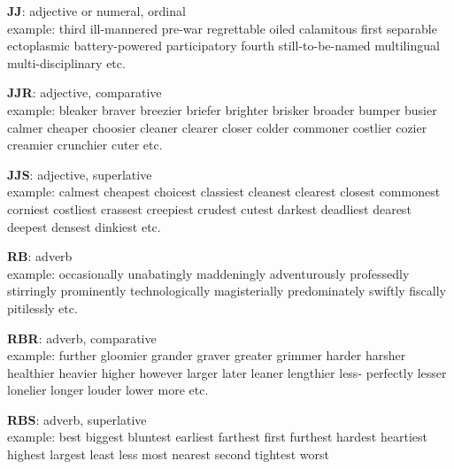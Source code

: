 {\bf JJ}: adjective or numeral, ordinal\\
example: third ill-mannered pre-war regrettable oiled calamitous first separable
ectoplasmic battery-powered participatory fourth still-to-be-named
multilingual multi-disciplinary etc.


{\bf JJR}: adjective, comparative\\
example: bleaker braver breezier briefer brighter brisker broader bumper busier
calmer cheaper choosier cleaner clearer closer colder commoner costlier
cozier creamier crunchier cuter etc.


{\bf JJS}: adjective, superlative\\
example: calmest cheapest choicest classiest cleanest clearest closest commonest
corniest costliest crassest creepiest crudest cutest darkest deadliest
dearest deepest densest dinkiest etc.


{\bf RB}: adverb\\
example: occasionally unabatingly maddeningly adventurously professedly
stirringly prominently technologically magisterially predominately
swiftly fiscally pitilessly etc.


{\bf RBR}: adverb, comparative\\
example: further gloomier grander graver greater grimmer harder harsher
healthier heavier higher however larger later leaner lengthier less-
perfectly lesser lonelier longer louder lower more etc.


{\bf RBS}: adverb, superlative\\
example: best biggest bluntest earliest farthest first furthest hardest
heartiest highest largest least less most nearest second tightest worst

